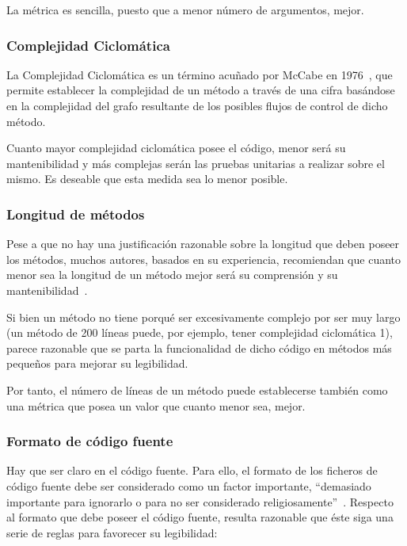 \documentclass[11pt]{article}
\begin{document}
La métrica es sencilla, puesto que a menor número de argumentos, mejor.

\subsubsection{Complejidad Ciclomática}

La Complejidad Ciclomática es un término acuñado por McCabe en 1976~\cite{mccabe:acomplexitymeasure}, que permite establecer la complejidad de un método a través de una cifra basándose en la complejidad del grafo resultante de los posibles flujos de control de dicho método.

Cuanto mayor complejidad ciclomática posee el código, menor será su mantenibilidad y más complejas serán las pruebas unitarias a realizar sobre el mismo. Es deseable que esta medida sea lo menor posible.

\subsubsection{Longitud de métodos}

Pese a que no hay una justificación razonable sobre la longitud que deben poseer los métodos, muchos autores, basados en su experiencia, recomiendan que cuanto menor sea la longitud de un método mejor será su comprensión y su mantenibilidad~\cite{unclebob:cleancode}.

Si bien un método no tiene porqué ser excesivamente complejo por ser muy largo (un método de 200 líneas puede, por ejemplo, tener complejidad ciclomática 1), parece razonable que se parta la funcionalidad de dicho código en métodos más pequeños para mejorar su legibilidad. 

Por tanto, el número de líneas de un método puede establecerse también como una métrica que posea un valor que cuanto menor sea, mejor.

\subsubsection{Formato de código fuente}

Hay que ser claro en el código fuente. Para ello, el formato de los ficheros de código fuente debe ser considerado como un factor importante, ``demasiado importante para ignorarlo o para no ser considerado religiosamente''~\cite{unclebob:cleancode}.
Respecto al formato que debe poseer el código fuente, resulta razonable que éste siga una serie de reglas para favorecer su legibilidad:
\end{document}
